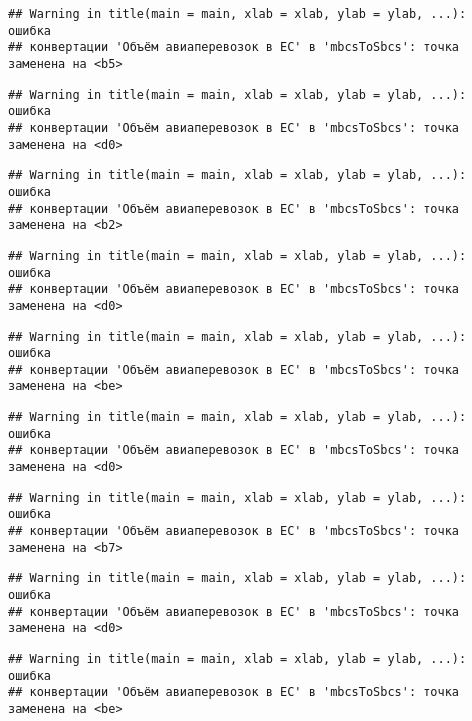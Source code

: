 \documentclass[
]{article}
\begin{document}
\begin{verbatim}
## Warning in title(main = main, xlab = xlab, ylab = ylab, ...): ошибка
## конвертации 'Объём авиаперевозок в ЕС' в 'mbcsToSbcs': точка заменена на <b5>
\end{verbatim}

\begin{verbatim}
## Warning in title(main = main, xlab = xlab, ylab = ylab, ...): ошибка
## конвертации 'Объём авиаперевозок в ЕС' в 'mbcsToSbcs': точка заменена на <d0>
\end{verbatim}

\begin{verbatim}
## Warning in title(main = main, xlab = xlab, ylab = ylab, ...): ошибка
## конвертации 'Объём авиаперевозок в ЕС' в 'mbcsToSbcs': точка заменена на <b2>
\end{verbatim}

\begin{verbatim}
## Warning in title(main = main, xlab = xlab, ylab = ylab, ...): ошибка
## конвертации 'Объём авиаперевозок в ЕС' в 'mbcsToSbcs': точка заменена на <d0>
\end{verbatim}

\begin{verbatim}
## Warning in title(main = main, xlab = xlab, ylab = ylab, ...): ошибка
## конвертации 'Объём авиаперевозок в ЕС' в 'mbcsToSbcs': точка заменена на <be>
\end{verbatim}

\begin{verbatim}
## Warning in title(main = main, xlab = xlab, ylab = ylab, ...): ошибка
## конвертации 'Объём авиаперевозок в ЕС' в 'mbcsToSbcs': точка заменена на <d0>
\end{verbatim}

\begin{verbatim}
## Warning in title(main = main, xlab = xlab, ylab = ylab, ...): ошибка
## конвертации 'Объём авиаперевозок в ЕС' в 'mbcsToSbcs': точка заменена на <b7>
\end{verbatim}

\begin{verbatim}
## Warning in title(main = main, xlab = xlab, ylab = ylab, ...): ошибка
## конвертации 'Объём авиаперевозок в ЕС' в 'mbcsToSbcs': точка заменена на <d0>
\end{verbatim}

\begin{verbatim}
## Warning in title(main = main, xlab = xlab, ylab = ylab, ...): ошибка
## конвертации 'Объём авиаперевозок в ЕС' в 'mbcsToSbcs': точка заменена на <be>
\end{verbatim}
\end{document}
